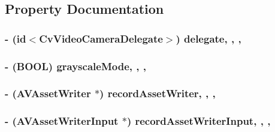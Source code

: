 \subsection{Property Documentation}
\hypertarget{interfaceCvVideoCamera_a34e036fdee24dcf4e0ca57e938b77cbd}{
\subsubsection[{delegate}]{\setlength{\rightskip}{0pt plus 5cm}-\/ (id$<${\bf Cv\-Video\-Camera\-Delegate}$>$) delegate\hspace{0.3cm}{\ttfamily [read]}, {\ttfamily [write]}, {\ttfamily [nonatomic]}, {\ttfamily [assign]}}}\label{interfaceCvVideoCamera_a34e036fdee24dcf4e0ca57e938b77cbd}
\hypertarget{interfaceCvVideoCamera_a940a9a17e136c091351db1f63e9fcacd}{
\subsubsection[{grayscale\-Mode}]{\setlength{\rightskip}{0pt plus 5cm}-\/ (B\-O\-O\-L) grayscale\-Mode\hspace{0.3cm}{\ttfamily [read]}, {\ttfamily [write]}, {\ttfamily [nonatomic]}, {\ttfamily [assign]}}}\label{interfaceCvVideoCamera_a940a9a17e136c091351db1f63e9fcacd}
\hypertarget{interfaceCvVideoCamera_a821ccd31c8a2260fe0292b9b4ae9cb3a}{
\subsubsection[{record\-Asset\-Writer}]{\setlength{\rightskip}{0pt plus 5cm}-\/ (A\-V\-Asset\-Writer $\ast$) record\-Asset\-Writer\hspace{0.3cm}{\ttfamily [read]}, {\ttfamily [write]}, {\ttfamily [nonatomic]}, {\ttfamily [retain]}}}\label{interfaceCvVideoCamera_a821ccd31c8a2260fe0292b9b4ae9cb3a}
\hypertarget{interfaceCvVideoCamera_a5331ee5ef533abefa38a44580f6e45f2}{
\subsubsection[{record\-Asset\-Writer\-Input}]{\setlength{\rightskip}{0pt plus 5cm}-\/ (A\-V\-Asset\-Writer\-Input $\ast$) record\-Asset\-Writer\-Input\hspace{0.3cm}{\ttfamily [read]}, {\ttfamily [write]}, {\ttfamily [nonatomic]}, {\ttfamily [retain]}}}\label{interfaceCvVideoCamera_a5331ee5ef533abefa38a44580f6e45f2}
